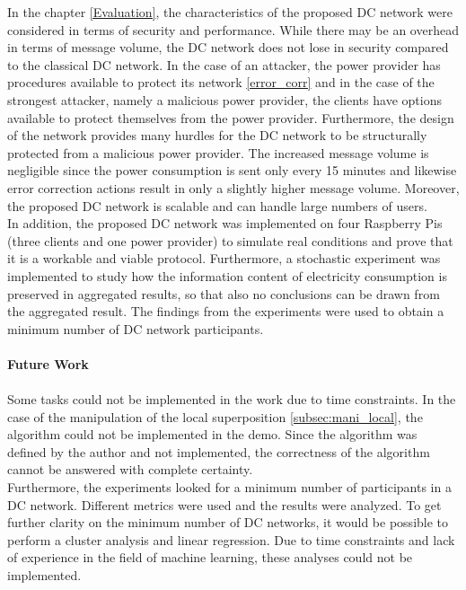 In the chapter \ref{Evaluation}, the characteristics of the proposed DC network were considered in terms of security and performance. While there may be an overhead in terms of message volume, the DC network does not lose in security compared to the classical DC network. In the case of an attacker, the power provider has procedures available to protect its network \ref{error_corr} and in the case of the strongest attacker, namely a malicious power provider, the clients have options available to protect themselves from the power provider. Furthermore, the design of the network provides many hurdles for the DC network to be structurally protected from a malicious power provider. The increased message volume is negligible since the power consumption is sent only every 15 minutes and likewise error correction actions result in only a slightly higher message volume. Moreover, the proposed DC network is scalable and can handle large numbers of users.\\
In addition, the proposed DC network was implemented on four Raspberry Pis (three clients and one power provider) to simulate real conditions and prove that it is a workable and viable protocol. Furthermore, a stochastic experiment was implemented to study how the information content of electricity consumption is preserved in aggregated results, so that also no conclusions can be drawn from the aggregated result. The findings from the experiments were used to obtain a minimum number of DC network participants. \\
\\
\textbf{Future Work}
\\
\\
Some tasks could not be implemented in the work due to time constraints. In the case of the manipulation of the local superposition \ref{subsec:mani_local}, the algorithm could not be implemented in the demo. Since the algorithm was defined by the author and not implemented, the correctness of the algorithm cannot be answered with complete certainty. \\
Furthermore, the experiments looked for a minimum number of participants in a DC network. Different metrics were used and the results were analyzed. To get further clarity on the minimum number of DC networks, it would be possible to perform a cluster analysis and linear regression. Due to time constraints and lack of experience in the field of machine learning, these analyses could not be implemented.





\cleardoublepage

